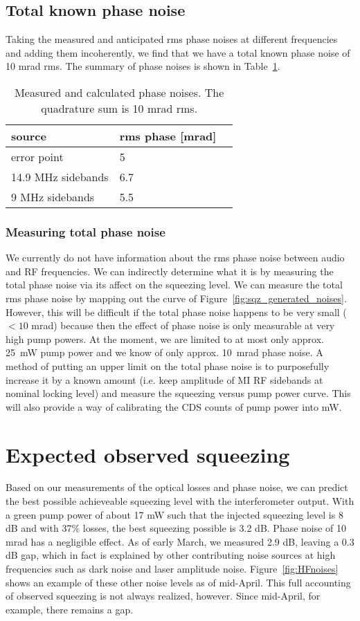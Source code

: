 \documentclass{ligodoc}
\begin{document}
\subsection{Total known phase noise}
Taking the measured and anticipated rms phase noises at different
frequencies and adding them incoherently, we find that we have a total
known phase noise of 10 mrad rms. The summary of phase noises is shown
in Table~\ref{tab:phasenoises}.

\begin{table}
\centering
\caption{Measured and calculated phase noises. The quadrature sum is
  10 mrad rms.}
\begin{tabular}{l l l}
\hline
source & rms phase [mrad]\\
\hline
error point & 5 \\
14.9 MHz sidebands & 6.7 \\
9 MHz sidebands & 5.5 \\
\hline
\end{tabular}
\label{tab:phasenoises}
\end{table}


\subsubsection{Measuring total phase noise}
We currently do not have information about the rms phase noise between
audio and RF frequencies. We can indirectly determine what it is by
measuring the total phase noise via its affect on the squeezing
level. We can measure the total rms phase noise by mapping out the
curve of Figure~\ref{fig:sqz_generated_noises}. However, this will be
difficult if the total phase noise happens to be very small ($< 10$
mrad) because then the effect of phase noise is only measurable at
very high pump powers. At the moment, we are limited to at most only
approx. 25~mW pump power and we know of only approx. 10~mrad phase
noise. A method of putting an upper limit on the total phase noise is
to purposefully increase it by a known amount (i.e. keep amplitude of
MI RF sidebands at nominal locking level) and measure the squeezing
versus pump power curve. This will also provide a way of calibrating
the CDS counts of pump power into mW.


\section{Expected observed squeezing}
Based on our measurements of the optical losses and phase noise, we
can predict the best possible achieveable squeezing level with the
interferometer output. With a green pump power of about 17 mW such
that the injected squeezing level is 8 dB and with 37\% losses, the
best squeezing possible is 3.2 dB. Phase noise of 10 mrad has a
negligible effect. As of early March, we measured 2.9 dB, leaving a
0.3 dB gap, which in fact is explained by other contributing noise
sources at high frequencies such as dark noise and laser amplitude
noise. Figure~\ref{fig:HFnoises} shows an example of these other
noise levels as of mid-April. This full accounting of observed
squeezing is not always realized, however. Since mid-April, for
example, there remains a gap.
\end{document}
